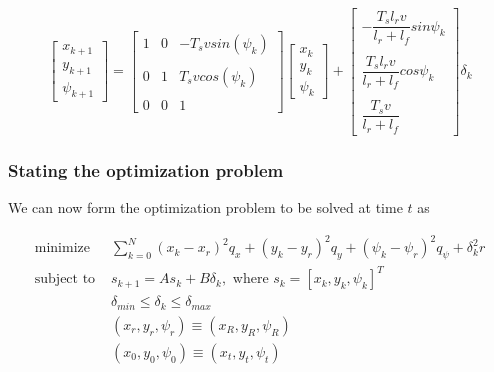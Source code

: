 \begin{equation}
  \begin{bmatrix}
    x_{k+1} \\
    y_{k+1} \\
    \psi_{k+1}
  \end{bmatrix}
  =
  \begin{bmatrix}
    1 & 0 & -T_s v sin(\psi_k) \\\\
    0 & 1 & T_s v cos(\psi_k) \\\\
    0 & 0 & 1
  \end{bmatrix}
  \begin{bmatrix}
    x_{k} \\
    y_{k} \\
    \psi_{k}
  \end{bmatrix}
  +
  \begin{bmatrix}
    -\dfrac{T_s l_r v}{l_r + l_f} sin\psi_k \\\\
    \dfrac{T_s l_r v}{l_r + l_f} cos\psi_k \\\\
    \dfrac{T_s v}{l_r+l_f}
  \end{bmatrix}
  \delta_{k}
\end{equation}



\subsubsection{Stating the optimization problem}

We can now form the optimization problem to be solved at time $t$ as

\begin{align}
  \text{minimize }    & \sum\limits_{k=0}^N (x_k-x_r)^2 q_x + (y_k-y_r)^2 q_y + (\psi_k-\psi_r)^2 q_{\psi} + \delta_k^2 r \\
  \text{subject to }  & s_{k+1} = A s_k + B \delta_k,\text{ where } s_k = [x_k, y_k, \psi_k]^T \\
                      & \delta_{min} \leq \delta_k \leq \delta_{max} \\
                      & (x_r, y_r, \psi_r) \equiv (x_R, y_R, \psi_R) \\
                      & (x_0, y_0, \psi_0) \equiv (x_t, y_t, \psi_t)
\end{align}
